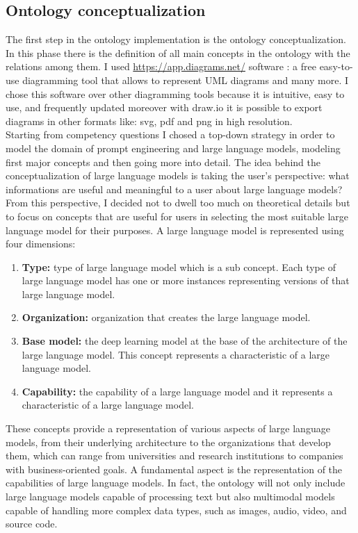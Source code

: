 \subsection{Ontology conceptualization}
The first step in the ontology implementation is the ontology conceptualization. In this phase there is the definition of all main concepts in the ontology with the relations among them. I used \href{draw.io}{https://app.diagrams.net/} software : a free easy-to-use diagramming tool that allows to represent UML diagrams and many more. I chose this software over other diagramming tools because it is intuitive, easy to use, and frequently updated moreover with draw.io it is possible to export diagrams in other formats like: svg, pdf and png in high resolution.\\
Starting from competency questions I chosed a top-down strategy in order to model the domain of prompt engineering and large language models, modeling first major concepts and then going more into detail. The idea behind the conceptualization of large language models is  taking the user's perspective: what informations are useful and meaningful to a user about large language models? From this perspective, I decided not to dwell too much on theoretical details but to focus on concepts that are useful for users in selecting the most suitable large language model for their purposes. A large language model is represented using four dimensions:
\begin{enumerate}
    \item \textbf{Type:} type of large language model which is a sub concept. Each type of large language model has one or more instances representing versions of that large language model.

    \item \textbf{Organization:} organization that creates the large language model.

    \item \textbf{Base model:} the deep learning model at the base of the architecture of the large language model. This concept represents a characteristic of a large language model.

    \item \textbf{Capability:} the capability of a large language model and it represents a characteristic of a large language model.
\end{enumerate}
These concepts provide a representation of various aspects of large language models, from their underlying architecture to the organizations that develop them, which can range from universities and research institutions to companies with business-oriented goals. A fundamental aspect is the representation of the capabilities of large language models. In fact, the ontology will not only include large language models capable of processing text but also multimodal models capable of handling more complex data types, such as images, audio, video, and source code.\\
